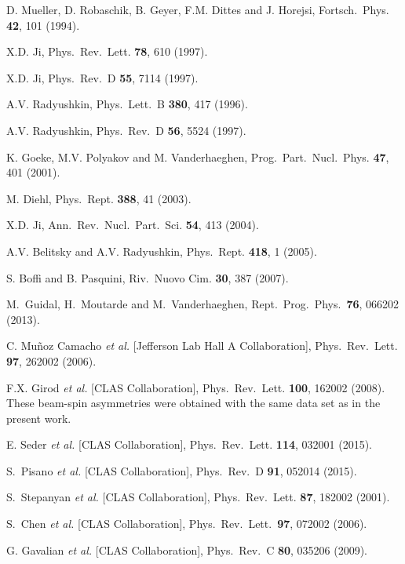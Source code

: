 \documentclass[nofootinbib,twocolumn,showpacs,prl,superscriptaddress,secnumarabic,amssymb,nobibnotes,aps,floatfix]{revtex4-1}
\begin{document}
\begin{thebibliography}{99}
D. Mueller, D. Robaschik, B. Geyer, F.M. Dittes and J. Horejsi,
Fortsch.\ Phys. {\bf 42}, 101 (1994).
  
X.D. Ji,
Phys.\ Rev.\ Lett. {\bf 78}, 610 (1997).

X.D. Ji,
Phys.\ Rev.\ D {\bf 55}, 7114 (1997).

A.V. Radyushkin,
Phys.\ Lett.\  B {\bf 380}, 417 (1996).

A.V. Radyushkin,
Phys.\ Rev.\ D {\bf 56}, 5524 (1997).

K. Goeke, M.V. Polyakov and M. Vanderhaeghen,
Prog.\ Part.\ Nucl.\ Phys. {\bf 47}, 401 (2001).

M. Diehl,
Phys.\ Rept.  {\bf 388}, 41 (2003).

X.D. Ji,
Ann.\ Rev.\ Nucl.\ Part.\ Sci. {\bf 54}, 413 (2004).

A.V. Belitsky and A.V. Radyushkin,
Phys.\ Rept. {\bf 418}, 1 (2005).

S. Boffi and B. Pasquini,
Riv.\ Nuovo Cim. {\bf 30}, 387 (2007).

M.~Guidal, H.~Moutarde and M.~Vanderhaeghen,
Rept.\ Prog.\ Phys.\  {\bf 76}, 066202 (2013).

C. Mu\~noz Camacho {\it et al.} [Jefferson Lab Hall A Collaboration],
Phys.\ Rev.\ Lett. {\bf 97}, 262002 (2006).

F.X. Girod {\it et al.} [CLAS Collaboration],
Phys.\ Rev.\ Lett. {\bf 100}, 162002 (2008).
These beam-spin asymmetries were obtained with the same data set
as in the present work.

E. Seder {\it et al.} [CLAS Collaboration],
Phys.\ Rev.\ Lett. {\bf 114}, 032001 (2015).

S.~Pisano {\it et al.} [CLAS Collaboration],
Phys.\ Rev.\ D {\bf 91}, 052014 (2015).

S.~Stepanyan {\it et al.} [CLAS Collaboration],
Phys.\ Rev.\ Lett. {\bf 87}, 182002 (2001).

S.~Chen {\it et al.} [CLAS Collaboration],
Phys.\ Rev.\ Lett.\ {\bf 97}, 072002 (2006).

G. Gavalian {\it et al.} [CLAS Collaboration],
Phys.\ Rev.\ C {\bf 80}, 035206 (2009).


\end{thebibliography}
\end{document}
